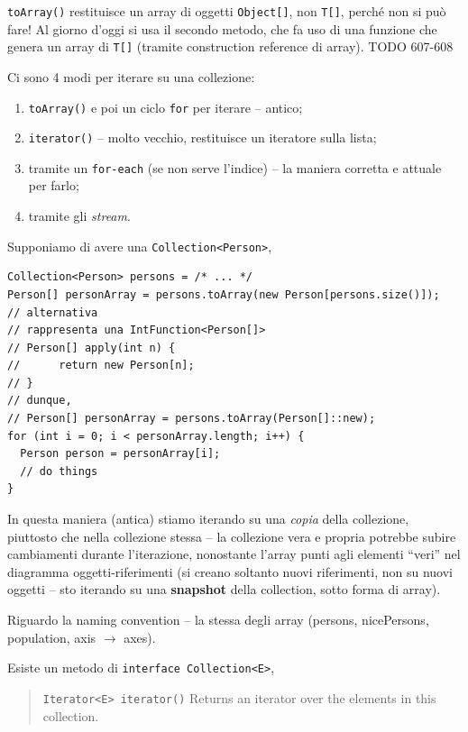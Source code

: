 \documentclass[\fontsizeclass,twocolumn]{\classname}
\theoremstyle{definition}
\theoremstyle{definition}
\begin{document}
\texttt{toArray()} restituisce un array di oggetti \texttt{Object[]}, non
\texttt{T[]}, perché non si può fare! Al giorno d'oggi si usa il secondo
metodo, che fa uso di una funzione che genera un array di \texttt{T[]} (tramite
construction reference di array). TODO 607-608

Ci sono 4 modi per iterare su una collezione:
\begin{enumerate}
    \item \texttt{toArray()} e poi un ciclo \texttt{for} per iterare -- antico;
    \item \texttt{iterator()} -- molto vecchio, restituisce un iteratore sulla
        lista;
    \item tramite un \texttt{for-each} (se non serve l'indice) -- la maniera
        corretta e attuale per farlo;
    \item tramite gli \emph{stream}.
\end{enumerate}

Supponiamo di avere una \texttt{Collection<Person>},

\begin{lstlisting}
Collection<Person> persons = /* ... */
Person[] personArray = persons.toArray(new Person[persons.size()]);
// alternativa
// rappresenta una IntFunction<Person[]>
// Person[] apply(int n) {
//      return new Person[n];
// }
// dunque,
// Person[] personArray = persons.toArray(Person[]::new);
for (int i = 0; i < personArray.length; i++) {
  Person person = personArray[i];
  // do things
}
\end{lstlisting}

In questa maniera (antica) stiamo iterando su una \emph{copia} della
collezione, piuttosto che nella collezione stessa -- la collezione vera e
propria potrebbe subire cambiamenti durante l'iterazione, nonostante l'array
punti agli elementi ``veri'' nel diagramma oggetti\--riferimenti (si creano
soltanto nuovi riferimenti, non su nuovi oggetti -- sto iterando su una
\textbf{snapshot} della collection, sotto forma di array).

Riguardo la naming convention -- la stessa degli array (persons, nicePersons,
population, axis $\rightarrow$ axes).

Esiste un metodo di \texttt{interface Collection<E>},

\begin{quote}
    \footnotesize{\texttt{Iterator<E>	iterator()}	Returns an iterator over the elements in this collection.}
\end{quote}
\end{document}
